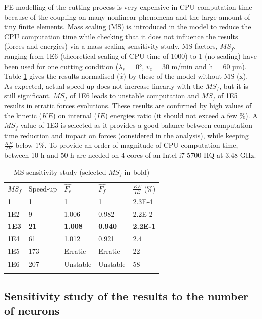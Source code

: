 \documentclass[final,5p,times,twocolumn]{elsarticle}
\begin{document}
FE modelling of the cutting process is very expensive in CPU computation time because of the coupling on many nonlinear phenomena and the large amount of tiny finite elements. Mass scaling (MS) is introduced in the model to reduce the CPU computation time while checking that it does not influence the results (forces and energies) via a mass scaling sensitivity study.
MS factors, ${MS}_f$, ranging from 1E6 (theoretical scaling of CPU time of 1000) to 1 (no scaling) have been used for one cutting condition ($\lambda_s$ = 0°, $v_c$ = 30 m/min and h = 60 µm). Table \ref{tab:MS} gives the results normalised ($\hat{x}$) by these of the model without MS (x). As expected, actual speed-up does not increase linearly with the ${MS}_f$, but it is still significant. ${MS}_f$ of 1E6 leads to unstable computation and ${MS}_f$ of 1E5 results in erratic forces evolutions. These results are confirmed by high values of the kinetic ($KE$) on internal ($IE$) energies ratio (it should not exceed a few \%). A ${MS}_f$ value of 1E3 is selected as it provides a good balance between computation time reduction and impact on forces (considered in the analysis), while keeping $\frac{KE}{IE}$ below 1\%. To provide an order of magnitude of CPU computation time, between 10 h and 50 h are needed on 4 cores of an Intel i7-5700 HQ at 3.48 GHz.

%
\begin{table}[!h]
\begin{center}
\caption{\label{tab:MS} MS sensitivity study (selected $MS_f$ in bold)}
\begin{tabular}{lllll}
\hline\noalign{\smallskip}
$MS_f$  & Speed-up & $\hat{F_c}$ & $\hat{F_f}$ & $\frac{KE}{IE}$ (\%)\\
\noalign{\smallskip}\hline\noalign{\smallskip}
1 & 1 & 1 & 1 & 2.3E-4\\
1E2 & 9 & 1.006 & 0.982 & 2.2E-2\\
\textbf{1E3} & \textbf{21} & \textbf{1.008} & \textbf{0.940} & \textbf{2.2E-1}\\
1E4 & 61 & 1.012 & 0.921 & 2.4\\
1E5 & 173 & Erratic & Erratic & 22\\
1E6 & 207 & Unstable & Unstable & 58\\
\noalign{\smallskip}\hline
\end{tabular}
\end{center}
\end{table}
%

\subsection{Sensitivity study of the results to the number of neurons}
\end{document}
